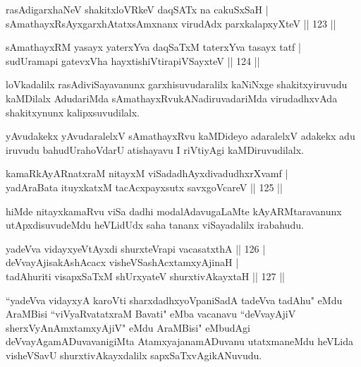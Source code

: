 
\begin{shl}
rasAdigarxhaNeV shakitxloVRkeV daqSATx na cakuSxSaH |\\
sAmathayxRsAyxgarxhAtatxsAmxnanx virudAdx parxkalapxyXteV \hfill || 123 ||
\end{shl}

\begin{shl}
sAmathayxRM yasayx yaterxYva daqSaTxM taterxYva tasayx tatf |\\
sudUramapi gatevxVha hayxtishiVtirapiVSayxteV \hfill || 124 ||
\end{shl}

\begin{artha}
loVkadalilx rasAdiviSayavanunx garxhisuvudaralilx kaNiNxge shakitxyiruvudu kaMDilalx AdudariMda sAmathayxRvukANadiruvadariMda virudadhxvAda shakitxynunx kalipxsuvudilalx.
\end{artha}

\begin{artha}
yAvudakekx yAvudaralelxV sAmathayxRvu kaMDideyo adaralelxV adakekx adu iruvudu bahudUrahoVdarU atishayavu I riVtiyAgi kaMDiruvudilalx.
\end{artha}

\begin{shl}
kamaRkAyARnatxraM nitayxM viSadadhAyxdivadudhxrXvamf |\\
yadAraBata ituyxkatxM tacAcxpayxsutx savxgoVcareV \hfill || 125 ||
\end{shl}

\begin{artha}
hiMde nitayxkamaRvu viSa dadhi modalAdavugaLaMte kAyARMtaravanunx utApxdisuvudeMdu heVLidUdx saha tananx viSayadalilx irabahudu.
\end{artha}

\begin{shl}
yadeVva vidayxyeVtAyxdi shurxteVrapi vacasatxthA \hfill || 126 |\\
deVvayAjisakAshAcacx visheVSashAcx\s \s tamxyAjinaH |\\
tadAhuriti visapxSaTxM shUrxyateV shurxtivAkayxtaH \hfill || 127 ||
\end{shl}

\begin{artha}
``yadeVva vidayxyA karoVti sharxdadhxyoVpaniSadA tadeVva tadAhu"  eMdu AraMBisi ``viVyaRvatatxraM Bavati" eMba vacanavu ``deVvayAjiV sherxVyAnAmxtamxyAjiV" eMdu AraMBisi" eMbudAgi  deVvayAgamADuvavanigiMta AtamxyajanamADuvanu utatxmaneMdu heVLida visheVSavU shurxtivAkayxdalilx sapxSaTxvAgikANuvudu.
\end{artha}

